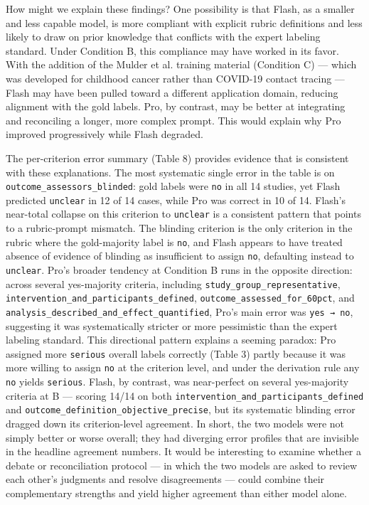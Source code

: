 \documentclass[11pt,a4paper]{article}
\begin{document}
How might we explain these findings? One possibility is that Flash, as a smaller and less capable model, is more compliant with explicit rubric definitions and less likely to draw on prior knowledge that conflicts with the expert labeling standard. Under Condition B, this compliance may have worked in its favor. With the addition of the Mulder et al. training material (Condition C) — which was developed for childhood cancer rather than COVID-19 contact tracing — Flash may have been pulled toward a different application domain, reducing alignment with the gold labels. Pro, by contrast, may be better at integrating and reconciling a longer, more complex prompt. This would explain why Pro improved progressively while Flash degraded.

The per-criterion error summary (Table 8) provides evidence that is consistent with these explanations. The most systematic single error in the table is on \texttt{outcome\_assessors\_blinded}: gold labels were \texttt{no} in all 14 studies, yet Flash predicted \texttt{unclear} in 12 of 14 cases, while Pro was correct in 10 of 14. Flash's near-total collapse on this criterion to \texttt{unclear} is a consistent pattern that points to a rubric-prompt mismatch. The blinding criterion is the only criterion in the rubric where the gold-majority label is \texttt{no}, and Flash appears to have treated absence of evidence of blinding as insufficient to assign \texttt{no}, defaulting instead to \texttt{unclear}. Pro's broader tendency at Condition B runs in the opposite direction: across several yes-majority criteria, including \texttt{study\_group\_representative}, \texttt{intervention\_and\_participants\_defined}, \texttt{outcome\_assessed\_for\_60pct}, and \texttt{analysis\_described\_and\_effect\_quantified},  Pro's main error was \texttt{yes → no}, suggesting it was systematically stricter or more pessimistic than the expert labeling standard. This directional pattern explains a seeming paradox: Pro assigned more \texttt{serious} overall labels correctly (Table 3) partly because it was more willing to assign \texttt{no} at the criterion level, and under the derivation rule any \texttt{no} yields \texttt{serious}. Flash, by contrast, was near-perfect on several yes-majority criteria at B — scoring 14/14 on both \texttt{intervention\_and\_participants\_defined} and \texttt{outcome\_definition\_objective\_precise}, but its systematic blinding error dragged down its criterion-level agreement. In short, the two models were not simply better or worse overall; they had diverging error profiles that are invisible in the headline agreement numbers. It would be interesting to examine whether a debate or reconciliation protocol — in which the two models are asked to review each other's judgments and resolve disagreements — could combine their complementary strengths and yield higher agreement than either model alone.
\end{document}
